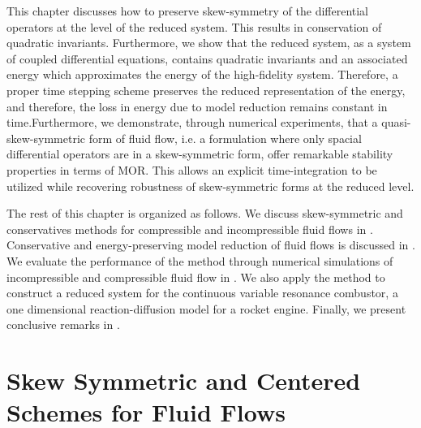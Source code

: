 This chapter discusses how to preserve skew-symmetry of the differential operators at the level of the reduced system. This results in conservation of quadratic invariants.  Furthermore, we show that the reduced system, as a system of coupled differential equations, contains quadratic invariants and an associated energy which approximates the energy of the high-fidelity system. Therefore, a proper time stepping scheme preserves the reduced representation of the energy, and therefore, the loss in energy due to model reduction remains constant in time.Furthermore, we demonstrate, through numerical experiments, that a quasi-skew-symmetric form of fluid flow, i.e. a formulation where only spacial differential operators are in a skew-symmetric form, offer remarkable stability properties in terms of MOR. This allows an explicit time-integration to be utilized while recovering robustness of skew-symmetric forms at the reduced level.

The rest of this chapter is organized as follows. We discuss skew-symmetric and conservatives methods for compressible and incompressible fluid flows in . Conservative and energy-preserving model reduction of fluid flows is discussed in . We evaluate the performance of the method through numerical simulations of incompressible and compressible fluid flow in . We also apply the method to construct a reduced system for the continuous variable resonance combustor, a one dimensional reaction-diffusion model for a rocket engine. Finally, we present conclusive remarks in .


\section{Skew Symmetric and Centered Schemes for Fluid Flows} \label{p4.sec:skew}

